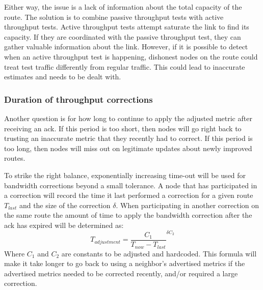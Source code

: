 \documentclass[11pt]{article}
\begin{document}
Either way, the issue is a lack of information about the total capacity of the route. The solution is to combine passive throughput tests with active throughput tests. Active throughput tests attempt saturate the link to find its capacity. If they are coordinated with the passive throughput test, they can gather valuable information about the link. However, if it is possible to detect when an active throughput test is happening, dishonest nodes on the route could treat test traffic differently from regular traffic. This could lead to inaccurate estimates and needs to be dealt with.

\subsubsection{Duration of throughput corrections}


Another question is for how long to continue to apply the adjusted metric after receiving an ack. If this period is too short, then nodes will go right back to trusting an inaccurate metric that they recently had to correct. If this period is too long, then nodes will miss out on legitimate updates about newly improved routes.

To strike the right balance, exponentially increasing time-out will be used for bandwidth corrections beyond a small tolerance. A node that has participated in a correction will record the time it last performed a correction for a given route $T_{last}$ and the size of the correction $\delta$. When participating in another correction on the same route the amount of time to apply the bandwidth correction after the ack has expired will be determined as:
\newline
\[
T_{adjustment} = \frac{C_1}{T_{now} - T_{last}}^{\delta C_2}
\]
\newline
Where $C_1$ and  $C_2$ are constants to be adjusted and hardcoded. This formula will make it take longer to go back to using a neighbor's advertised metrics if the advertised metrics needed to be corrected recently, and/or required a large correction.
\end{document}
